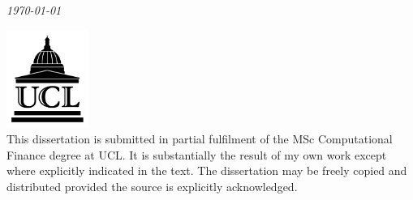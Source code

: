 \begin{titlepage}
	{\large\textit\today} %
	
       \includegraphics[width=0.2\textwidth]{ucl_logo.jpg}\\[1cm] %
	
	
	 This dissertation is submitted in partial fulfilment of the MSc Computational Finance degree at UCL. It is substantially the result of my own work except where explicitly indicated in the text. The dissertation may be freely copied and distributed provided the source is explicitly acknowledged.

	

	
\end{titlepage}